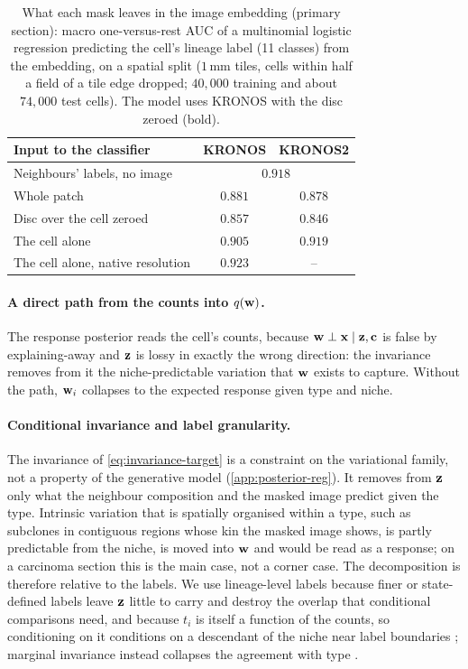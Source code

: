 \begin{table}[!htbp]
\centering
\caption{What each mask leaves in the image embedding (primary section): macro one-versus-rest AUC of a multinomial logistic regression predicting the cell's lineage label (11 classes) from the embedding, on a spatial split ($1\,$mm tiles, cells within half a field of a tile edge dropped; $40{,}000$ training and about $74{,}000$ test cells). The model uses KRONOS with the disc zeroed (bold).}
\label{tab:masking}
\small
\begin{tabular}{@{}lcc@{}}
\toprule
Input to the classifier & KRONOS & KRONOS2 \\
\midrule
Neighbours' labels, no image & \multicolumn{2}{c}{$0.918$} \\
Whole patch & $0.881$ & $0.878$ \\
Disc over the cell zeroed & $\mathbf{0.857}$ & $0.846$ \\
The cell alone & $0.905$ & $0.919$ \\
The cell alone, native resolution & $0.923$ & -- \\
\bottomrule
\end{tabular}
\end{table}

\paragraph{A direct path from the counts into $q(\mathbf{w})$.}
\label{app:qw}
The response posterior reads the cell's counts, because $\mathbf{w} \perp \mathbf{x} \mid \mathbf{z}, \mathbf{c}$ is false by explaining-away and $\mathbf{z}$ is lossy in exactly the wrong direction: the invariance removes from it the niche-predictable variation that $\mathbf{w}$ exists to capture. Without the path, $\mathbf{w}_i$ collapses to the expected response given type and niche.

\paragraph{Conditional invariance and label granularity.}
\label{app:conditional}
The invariance of \cref{eq:invariance-target} is a constraint on the variational family, not a property of the generative model (\cref{app:posterior-reg}). It removes from $\mathbf{z}$ only what the neighbour composition and the masked image predict given the type. Intrinsic variation that is spatially organised within a type, such as subclones in contiguous regions whose kin the masked image shows, is partly predictable from the niche, is moved into $\mathbf{w}$ and would be read as a response; on a carcinoma section this is the main case, not a corner case. The decomposition is therefore relative to the labels. We use lineage-level labels because finer or state-defined labels leave $\mathbf{z}$ little to carry and destroy the overlap that conditional comparisons need, and because $t_i$ is itself a function of the counts, so conditioning on it conditions on a descendant of the niche near label boundaries \citep{hernan2004}; marginal invariance instead collapses the agreement with type \citep{slavutsky2025}.
